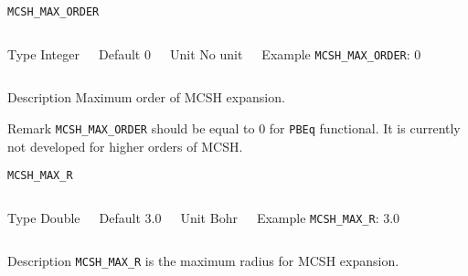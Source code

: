 	
	\begin{frame}[allowframebreaks]{\texttt{MCSH\_MAX\_ORDER}} \label{MCSH_MAX_ORDER}
	\vspace*{-12pt}
	\begin{columns}
	\begin{block}{Type}
	Integer
	\end{block}
	
	\begin{block}{Default}
	0
	\end{block}
	
	\begin{block}{Unit}
	No unit
	\end{block}
	
	\begin{block}{Example}
	\texttt{MCSH\_MAX\_ORDER}: 0
	\end{block}
	\end{columns}
	
	\begin{block}{Description}
	Maximum order of MCSH expansion.
	\end{block}
	
	\begin{block}{Remark}
	\texttt{MCSH\_MAX\_ORDER} should be equal to 0 for \texttt{PBEq} functional. It is currently not developed for higher orders of MCSH.
	\end{block}
	
	\end{frame}
	
	\begin{frame}[allowframebreaks]{\texttt{MCSH\_MAX\_R}} \label{MCSH_MAX_R}
	\vspace*{-12pt}
	\begin{columns}
	\column{0.4\linewidth}
	\begin{block}{Type}
	Double
	\end{block}
	
	\begin{block}{Default}
	3.0
	\end{block}
	
	\column{0.4\linewidth}
	\begin{block}{Unit}
	Bohr
	\end{block}
	
	\begin{block}{Example}
	\texttt{MCSH\_MAX\_R}: 3.0
	\end{block}
	\end{columns}
	
	\begin{block}{Description}
	\texttt{MCSH\_MAX\_R} is the maximum radius for MCSH expansion.
	\end{block}
	
	\end{frame}
	
